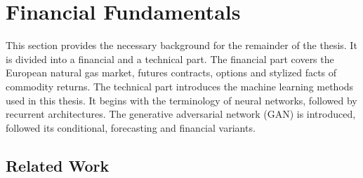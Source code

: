 \section{Financial Fundamentals}\label{sec:financial-fundamentals}
This section provides the necessary background for the remainder of the thesis. It is divided into a financial and a technical part. 
The financial part covers the European natural gas market, futures contracts, options and stylized facts of commodity returns. The technical part introduces the machine learning methods used in this thesis. It begins with the terminology of neural networks, followed by recurrent architectures. The generative adversarial network (GAN) is introduced, followed its conditional, forecasting and financial variants.



\clearpage
\subsection{Related Work}\label{sec:relwork}